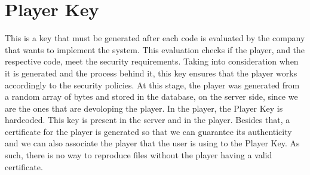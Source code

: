 \documentclass[11pt,a4paper]{report}
\begin{document}
\section{Player Key}
This is a key that must be generated after each code is evaluated by the company that wants to implement the system. 
This evaluation checks if the player, and the respective code, meet the security requirements. 
Taking into consideration when it is generated and the process behind it, this key ensures that the player works accordingly to the security policies.
\newline At this stage, the player was generated from a random array of bytes and stored in the database, on the server side, since we are the ones that are devoloping the player.
In the player, the Player Key is hardcoded.
\newline This key is present in the server and in the player.
Besides that, a certificate for the player is generated so that we can guarantee its authenticity and we can also associate the player that the user is using to the Player Key. As such, there is no way to reproduce files without the player having a valid certificate.
\end{document}
